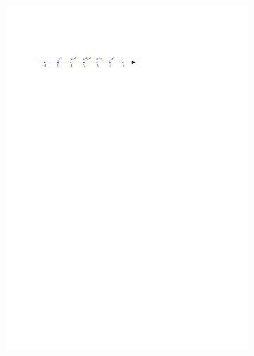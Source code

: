 \documentclass[final,3p,mathptmx]{elsarticle}
\begin{document}
\begin{figure}[h]
	\centering
	\begin{subfigure}{0.47\textwidth}
		\includegraphics[width=\textwidth, keepaspectratio]{figures/newtonpoly_1.pdf}
	\end{subfigure}


\end{figure}
\end{document}
